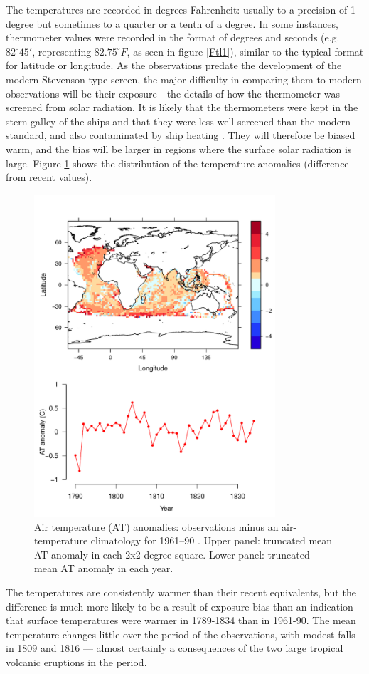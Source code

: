\documentclass[CP]{copernicus}
\begin{document}
The temperatures are recorded in degrees Fahrenheit: usually to a precision of 1 degree but sometimes to a quarter or a tenth of a degree. In some instances, thermometer values were recorded in the format of degrees and seconds (e.g. $82^\circ 45'$, representing $82.75^\circ F$, as seen in figure \ref{Ftl1}), similar to the typical format for latitude or longitude. As the observations predate the development of the modern Stevenson-type screen, the major difficulty in comparing them to modern observations will be their exposure - the details of how the thermometer was screened from solar radiation. It is likely that the thermometers were kept in the stern galley of the ships and that they were less well screened than the modern standard, and also contaminated by ship heating \citep{chenoweth00homogenization,Berry05}. They will therefore be biased warm, and the bias will be larger in regions where the surface solar radiation is large. Figure \ref{pwat1} shows the distribution of the temperature anomalies (difference from recent values).
\begin{figure}[!hbp]
\begin{center}
\includegraphics[angle=0, width=0.8\textwidth]{../figures/temperatures}
\caption{Air temperature (AT) anomalies: observations minus an air-temperature climatology for 1961--90 \citep{rayner03HadISST1}. Upper panel: truncated mean AT anomaly in each 2x2 degree square. Lower panel: truncated mean AT anomaly in each year.}
\label{pwat1}
\end{center}
\end{figure}
The temperatures are consistently warmer than their recent equivalents, but the difference is much more likely to be a result of exposure bias than an indication that surface temperatures were warmer in 1789-1834 than in 1961-90. The mean temperature changes little over the period of the observations, with modest falls in 1809 and 1816 --- almost certainly a consequences of the two large tropical volcanic eruptions in the period.
\end{document}
